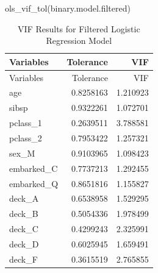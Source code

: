 \documentclass[
  letterpaper,
  DIV=11,
  numbers=noendperiod]{scrartcl}
\newenvironment{Shaded}{\begin{snugshade}}{\end{snugshade}}
\newcommand{\FunctionTok}[1]{\textcolor[rgb]{0.28,0.35,0.67}{#1}}
\newcommand{\NormalTok}[1]{\textcolor[rgb]{0.00,0.23,0.31}{#1}}
\begin{document}
\begin{Shaded}
\begin{Highlighting}[]
\FunctionTok{ols\_vif\_tol}\NormalTok{(binary.model.filtered)}
\end{Highlighting}
\end{Shaded}

\begin{longtable}[]{@{}lrr@{}}
\caption{VIF Results for Filtered Logistic Regression
Model}\tabularnewline
\toprule\noalign{}
Variables & Tolerance & VIF \\
\midrule\noalign{}
\endfirsthead
\toprule\noalign{}
Variables & Tolerance & VIF \\
\midrule\noalign{}
\endhead
\bottomrule\noalign{}
\endlastfoot
age & 0.8258163 & 1.210923 \\
sibsp & 0.9322261 & 1.072701 \\
pclass\_1 & 0.2639511 & 3.788581 \\
pclass\_2 & 0.7953422 & 1.257321 \\
sex\_M & 0.9103965 & 1.098423 \\
embarked\_C & 0.7737213 & 1.292455 \\
embarked\_Q & 0.8651816 & 1.155827 \\
deck\_A & 0.6538958 & 1.529295 \\
deck\_B & 0.5054336 & 1.978499 \\
deck\_C & 0.4299243 & 2.325991 \\
deck\_D & 0.6025945 & 1.659491 \\
deck\_F & 0.3615519 & 2.765855 \\
\end{longtable}
\end{document}
